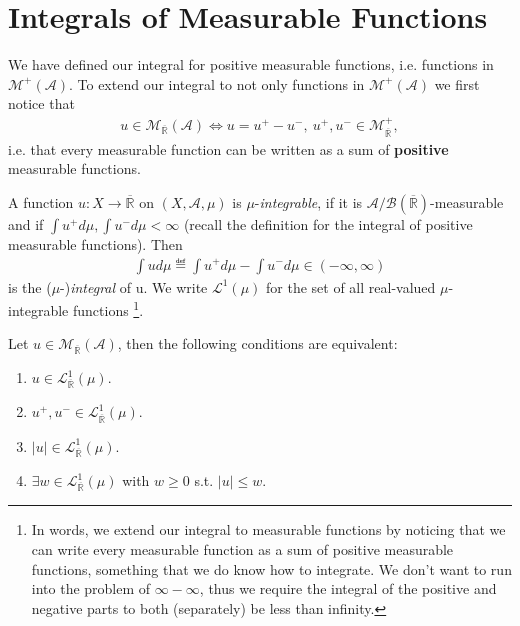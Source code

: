 \section{Integrals of Measurable Functions}
We have defined our integral for positive measurable functions, i.e. functions in \(\mathcal{M}^{+}(\mathscr{A})\). To extend our integral
to not only functions in \(\mathcal{M}^{+}(\mathscr{A})\) we first notice that
\begin{align}
    u \in \mathcal{M}_{\overline{\mathbb{R}}}(\mathscr{A}) \Leftrightarrow 
    u = u^+ - u^-, \ u^+, u^-\in \mathcal{M}^{+}_{\overline{\mathbb{R}}},
\end{align}
i.e. that every measurable function can be written as a sum of \textbf{positive} measurable functions.

\begin{definition}[\(\mu\)-integrable]
    A function \(u:X \rightarrow \overline{\mathbb{R}}\) on \((X, \mathscr{A}, \mu)\) is \(\mu\)-\emph{integrable}, if it is 
    \(\mathscr{A}/\mathscr{B}(\overline{\mathbb{R}})\)-measurable and if \(\int u^+ d\mu, \int u^-d\mu < \infty\) (recall the definition
    for the integral of positive measurable functions). Then
    \begin{align}
        \int ud\mu \eqdef \int u^+d\mu - \int u^-d\mu \in (-\infty, \infty)
    \end{align}
    is the (\(\mu\)-)\emph{integral} of u. We write \(\mathcal{L}^1(\mu)\) for the set of all real-valued \(\mu\)-integrable functions
    \footnote{In words, we extend our integral to  measurable functions by noticing that we can write every measurable 
    function as a sum of positive measurable functions, something that we do know how to integrate. We don't want to run into the problem
    of \(\infty - \infty\), thus we require the integral of the positive and negative parts to both (separately) be less than infinity.}.
\end{definition}
\begin{theorem}
    Let \(u\in \mathcal{M}_{\overline{\mathbb{R}}}(\mathscr{A})\), then the following conditions are equivalent:
    \begin{enumerate}[label=(\roman*)]
        \item \(u \in \mathcal{L}^{1}_{\overline{\mathbb{R}}}(\mu)\).
        \item \(u^+, u^- \in \mathcal{L}^{1}_{\overline{\mathbb{R}}}(\mu)\).
        \item \(\vert u\vert \in \mathcal{L}^{1}_{\overline{\mathbb{R}}}(\mu)\).
        \item \(\exists w \in \mathcal{L}^{1}_{\overline{\mathbb{R}}}(\mu)\) with \(w\geq 0\) s.t. \(\vert u \vert \leq w\).
    \end{enumerate}
\end{theorem}
